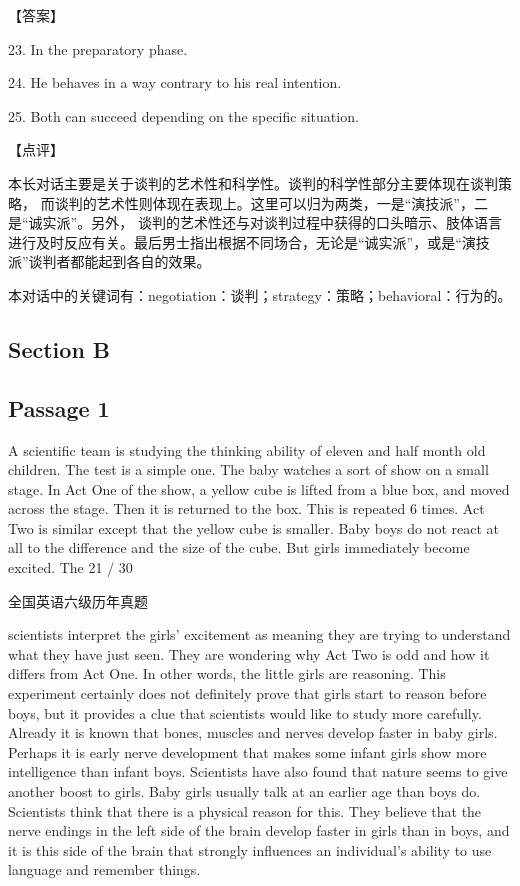 \documentclass[UTF8,11pt]{ctexart}
\begin{document}
【答案】


23. In the preparatory phase.


24. He behaves in a way contrary to his real intention.


25. Both can succeed depending on the specific situation.


【点评】


本长对话主要是关于谈判的艺术性和科学性。谈判的科学性部分主要体现在谈判策略， 而谈判的艺术性则体现在表现上。这里可以归为两类，一是“演技派”，二是“诚实派”。另外， 谈判的艺术性还与对谈判过程中获得的口头暗示、肢体语言进行及时反应有关。最后男士指出根据不同场合，无论是“诚实派”，或是“演技派”谈判者都能起到各自的效果。


本对话中的关键词有：negotiation：谈判；strategy：策略；behavioral：行为的。


\subsection*{Section B}


\subsection*{Passage 1}


A scientific team is studying the thinking ability of eleven and half month old children. The test is a simple one. The baby watches a sort of show on a small stage. In Act One of the show, a yellow cube is lifted from a blue box, and moved across the stage. Then it is returned to the box. This is repeated 6 times. Act Two is similar except that the yellow cube is smaller. Baby boys do not react at all to the difference and the size of the cube. But girls immediately become excited. The 21 / 30


全国英语六级历年真题


scientists interpret the girls’ excitement as meaning they are trying to understand what they have just seen. They are wondering why Act Two is odd and how it differs from Act One. In other words, the little girls are reasoning. This experiment certainly does not definitely prove that girls start to reason before boys, but it provides a clue that scientists would like to study more carefully. Already it is known that bones, muscles and nerves develop faster in baby girls. Perhaps it is early nerve development that makes some infant girls show more intelligence than infant boys. Scientists have also found that nature seems to give another boost to girls. Baby girls usually talk at an earlier age than boys do. Scientists think that there is a physical reason for this. They believe that the nerve endings in the left side of the brain develop faster in girls than in boys, and it is this side of the brain that strongly influences an individual’s ability to use language and remember things.
\end{document}
